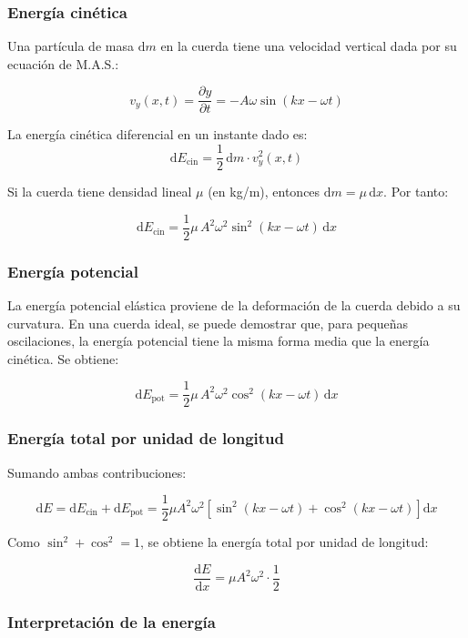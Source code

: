 \subsubsection{Energía cinética}

Una partícula de masa \(\mathrm{d}m\) en la cuerda tiene una velocidad vertical dada por su ecuación de M.A.S.:

\[
v_y(x,t) = \frac{\partial y}{\partial t} = -A \omega \sin(kx - \omega t)
\]

La energía cinética diferencial en un instante dado es:
\[
\mathrm{d}E_{\text{cin}} = \frac{1}{2} \, \mathrm{d}m \cdot v_y^2(x,t)
\]

Si la cuerda tiene densidad lineal \(\mu\) (en kg/m), entonces \(\mathrm{d}m = \mu \, \mathrm{d}x\). Por tanto:

\[
\mathrm{d}E_{\text{cin}} = \frac{1}{2} \mu \, A^2 \omega^2 \sin^2(kx - \omega t) \, \mathrm{d}x
\]

\subsubsection{Energía potencial}

La energía potencial elástica proviene de la deformación de la cuerda debido a su curvatura. En una cuerda ideal, se puede demostrar que, para pequeñas oscilaciones, la energía potencial tiene la misma forma media que la energía cinética. Se obtiene:

\[
\mathrm{d}E_{\text{pot}} = \frac{1}{2} \mu \, A^2 \omega^2 \cos^2(kx - \omega t) \, \mathrm{d}x
\]

\subsubsection{Energía total por unidad de longitud}

Sumando ambas contribuciones:

\[
\mathrm{d}E = \mathrm{d}E_{\text{cin}} + \mathrm{d}E_{\text{pot}} = \frac{1}{2} \mu A^2 \omega^2 \left[ \sin^2(kx - \omega t) + \cos^2(kx - \omega t) \right] \mathrm{d}x
\]

Como \(\sin^2 + \cos^2 = 1\), se obtiene la energía total por unidad de longitud:

\[
\frac{\mathrm{d}E}{\mathrm{d}x} = \mu A^2 \omega^2 \cdot \frac{1}{2}
\]


\subsubsection{Interpretación de la energía}

